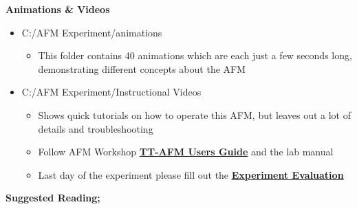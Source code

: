 \documentclass{../lab}
\begin{document}
\textbf{Animations \& Videos}

\begin{itemize}
    \item C:/AFM Experiment/animations

    \begin{itemize}
        \item This folder contains 40 animations which are each just a few seconds long, demonstrating different concepts about the AFM

    \end{itemize}

    \item C:/AFM Experiment/Instructional Videos

    \begin{itemize}
        \item Shows quick tutorials on how to operate this AFM, but leaves out a lot of details and troubleshooting

        \item Follow AFM Workshop \href{http://experimentationlab.berkeley.edu/tt-afmuserguidev2.2}{\textbf{TT-AFM Users Guide}} and the  lab manual

        \item Last day of the experiment please fill out the \href{\ExperimentEvaluation}{\textbf{Experiment Evaluation}}

    \end{itemize}

\end{itemize}

\textbf{Suggested Reading;}
\end{document}
